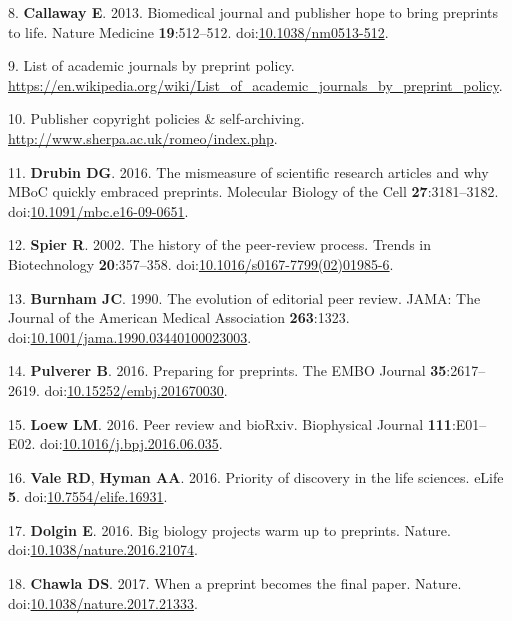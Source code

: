 \documentclass[11pt,]{article}
\begin{document}
\hypertarget{ref-Callaway2013}{}
8. \textbf{Callaway E}. 2013. Biomedical journal and publisher hope to
bring preprints to life. Nature Medicine \textbf{19}:512--512.
doi:\href{https://doi.org/10.1038/nm0513-512}{10.1038/nm0513-512}.

\hypertarget{ref-PreprintPolicy}{}
9. List of academic journals by preprint policy.
\url{https://en.wikipedia.org/wiki/List_of_academic_journals_by_preprint_policy}.

\hypertarget{ref-Sherpa}{}
10. Publisher copyright policies \& self-archiving.
\url{http://www.sherpa.ac.uk/romeo/index.php}.

\hypertarget{ref-Drubin2016}{}
11. \textbf{Drubin DG}. 2016. The mismeasure of scientific research
articles and why MBoC quickly embraced preprints. Molecular Biology of
the Cell \textbf{27}:3181--3182.
doi:\href{https://doi.org/10.1091/mbc.e16-09-0651}{10.1091/mbc.e16-09-0651}.

\hypertarget{ref-Spier2002}{}
12. \textbf{Spier R}. 2002. The history of the peer-review process.
Trends in Biotechnology \textbf{20}:357--358.
doi:\href{https://doi.org/10.1016/s0167-7799(02)01985-6}{10.1016/s0167-7799(02)01985-6}.

\hypertarget{ref-Burnham1990}{}
13. \textbf{Burnham JC}. 1990. The evolution of editorial peer review.
JAMA: The Journal of the American Medical Association \textbf{263}:1323.
doi:\href{https://doi.org/10.1001/jama.1990.03440100023003}{10.1001/jama.1990.03440100023003}.

\hypertarget{ref-Pulverer2016}{}
14. \textbf{Pulverer B}. 2016. Preparing for preprints. The EMBO Journal
\textbf{35}:2617--2619.
doi:\href{https://doi.org/10.15252/embj.201670030}{10.15252/embj.201670030}.

\hypertarget{ref-Loew2016}{}
15. \textbf{Loew LM}. 2016. Peer review and bioRxiv. Biophysical Journal
\textbf{111}:E01--E02.
doi:\href{https://doi.org/10.1016/j.bpj.2016.06.035}{10.1016/j.bpj.2016.06.035}.

\hypertarget{ref-Vale2016}{}
16. \textbf{Vale RD}, \textbf{Hyman AA}. 2016. Priority of discovery in
the life sciences. eLife \textbf{5}.
doi:\href{https://doi.org/10.7554/elife.16931}{10.7554/elife.16931}.

\hypertarget{ref-Dolgin2016}{}
17. \textbf{Dolgin E}. 2016. Big biology projects warm up to preprints.
Nature.
doi:\href{https://doi.org/10.1038/nature.2016.21074}{10.1038/nature.2016.21074}.

\hypertarget{ref-SinghChawla2017}{}
18. \textbf{Chawla DS}. 2017. When a preprint becomes the final paper.
Nature.
doi:\href{https://doi.org/10.1038/nature.2017.21333}{10.1038/nature.2017.21333}.
\end{document}
